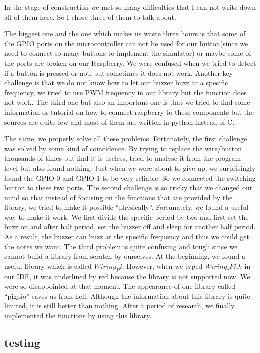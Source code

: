 \documentclass[11pt]{article}
\begin{document}
In the stage of construction we met so many difficulties that I can not write down all of them here. So I chose three of them to talk about.

The biggest one and the one which makes us waste three hours is that some of the GPIO ports on the microcontroller can not be used for our button(since we need to connect so many buttons to implement the simulator) or maybe some of the ports are broken on our Raspberry. We were confused when we tried to detect if a button is pressed or not, but sometimes it does not work. Another key challenge is that we do not know how to let our buzzer buzz at a specific frequency, we tried to use PWM frequency in our library but the function does not work. The third one but also an important one is that we tried to find some information or tutorial on how to connect raspberry to these components but the sources are quite few and most of them are written in python instead of C.

The same, we properly solve all these problems. Fortunately, the first challenge was solved by some kind of coincidence. By trying to replace the wire/button thousands of times but find it is useless, tried to analyse it from the program level but also found nothing. Just when we were about to give up, we surprisingly found the GPIO 0 and GPIO 1 to be very reliable. So we connected the switching button to these two ports. The second challenge is so tricky that we changed our mind so that instead of focusing on the functions that are provided by the library, we tried to make it possible “physically”. Fortunately, we found a useful way to make it work. We first divide the specific period by two and first set the buzz on and after half period, set the buzzer off and sleep for another half period. As a result, the buzzer can buzz at the specific frequency and thus we could get the notes we want. The third problem is quite confusing and tough since we cannot build a library from scratch by ourselves. At the beginning, we found a useful library which is called $Wiring_Pi$. However, when we typed $Wiring\_Pi.h$ in our IDE, it was underlined by red because the library is not supported now. We were so disappointed at that moment. The appearance of one library called “pigpio” saves us from hell. Although the information about this library is quite limited, it is still better than nothing. After a period of research, we finally implemented the functions by using this library. 


\subsection{testing}
\end{document}
